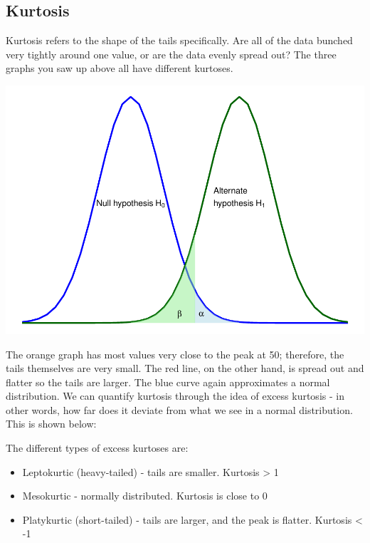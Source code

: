\documentclass[
]{book}
\providecommand{\tightlist}{%
  \setlength{\itemsep}{0pt}\setlength{\parskip}{0pt}}
\begin{document}
\subsection{Kurtosis}\label{kurtosis}

Kurtosis refers to the shape of the tails specifically. Are all of the data bunched very tightly around one value, or are the data evenly spread out? The three graphs you saw up above all have different kurtoses.

\begin{center}\includegraphics{_main_files/figure-latex/unnamed-chunk-83-1} \end{center}

The orange graph has most values very close to the peak at 50; therefore, the tails themselves are very small. The red line, on the other hand, is spread out and flatter so the tails are larger. The blue curve again approximates a normal distribution. We can quantify kurtosis through the idea of excess kurtosis - in other words, how far does it deviate from what we see in a normal distribution. This is shown below:

The different types of excess kurtoses are:

\begin{itemize}
\tightlist
\item
  Leptokurtic (heavy-tailed) - tails are smaller. Kurtosis \textgreater{} 1
\item
  Mesokurtic - normally distributed. Kurtosis is close to 0
\item
  Platykurtic (short-tailed) - tails are larger, and the peak is flatter. Kurtosis \textless{} -1
\end{itemize}
\end{document}
